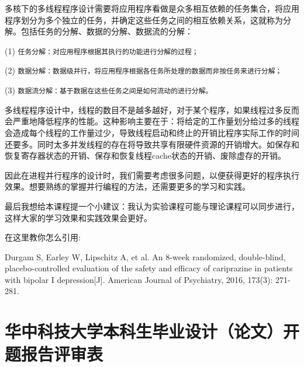 \documentclass[supercite]{Experimental_Report}
\theoremstyle{definition}
\begin{document}
多核下的多线程程序设计需要将应用程序看做是众多相互依赖的任务集合，将应用程序划分为多个独立的任务，并确定这些任务之间的相互依赖关系，这就称为分解。包括任务的分解、数据的分解、数据流的分解：

(1) \texttt{任务分解：对应用程序根据其执行的功能进行分解的过程；}

(2) \texttt{数据分解：数据级并行，将应用程序根据各任务所处理的数据而非按任务来进行分解；}

(3) \texttt{数据流分解：基于数据在这些任务之间是如何流动的进行分解。}

多线程程序设计中，线程的数目不是越多越好，对于某个程序，如果线程过多反而会严重地降低程序的性能。这种影响主要在于：将给定的工作量划分给过多的线程会造成每个线程的工作量过少，导致线程启动和终止的开销比程序实际工作的时间还要多。同时太多并发线程的存在将导致共享有限硬件资源的开销增大。如保存和恢复寄存器状态的开销、保存和恢复线程cache状态的开销、废除虚存的开销。

因此在进程并行程序的设计时，我们需要考虑很多问题，以便获得更好的程序执行效果。想要熟练的掌握并行编程的方法，还需要更多的学习和实践。

最后我想给本课程提一个小建议：我认为实验课程可能与理论课程可以同步进行，这样大家的学习效果和实践效果会更好。

在这里教你怎么引用:\cite{ref1}

\begin{thebibliography}{99}  

Durgam S, Earley W, Lipschitz A, et al. An 8-week randomized, double-blind, placebo-controlled evaluation of the safety and efficacy of cariprazine in patients with bipolar I depression[J]. American Journal of Psychiatry, 2016, 173(3): 271-281.

\end{thebibliography}


\section*{ 华中科技大学本科生毕业设计（论文）开题报告评审表}
\thispagestyle{empty}
\end{document}
